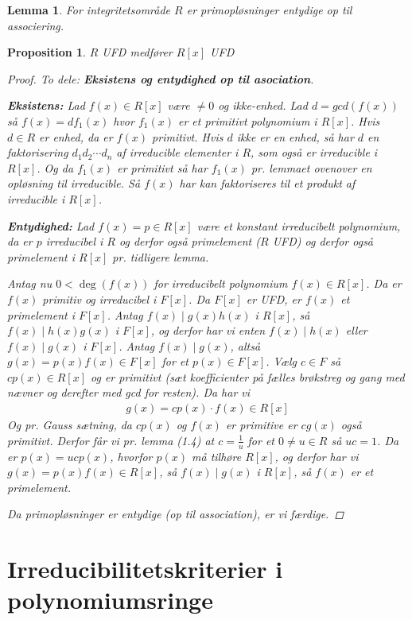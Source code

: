 \documentclass[10pt,twoside,openany,final]{memoir}
\theoremstyle{break}
\newtheorem{lemma}[section]{Lemma}
\newtheorem{proposition}[section]{Proposition}
\theoremstyle{Break}
\begin{document}
\begin{lemma}
For integritetsområde $R$ er primopløsninger entydige op til associering.
\end{lemma}
\begin{proposition}
$R$ UFD medfører $R[x]$ UFD
\begin{proof}
To dele: \textbf{Eksistens og \textbf{entydighed op til asociation}}.

\textbf{Eksistens:} Lad $f(x) \in R[x]$ være $\neq 0$ og ikke-enhed. Lad $d=gcd(f(x))$ så $f(x)=df_1(x)$ hvor $f_1(x)$ er et primitivt polynomium i $R[x]$. Hvis $d \in R$ er enhed, da er $f(x)$ primitivt. Hvis $d$ ikke er en enhed, så har $d$ en faktorisering $d_1d_2\cdots d_n$ af irreducible elementer i $R$, som også er irreducible i $R[x]$. Og da $f_1(x)$ er primitivt så har $f_1(x)$ pr. lemmaet ovenover en opløsning til irreducible. Så $f(x)$ har kan faktoriseres til et produkt af irreducible i $R[x]$.

\textbf{Entydighed:}
Lad $f(x)=p \in R[x]$ være et konstant irreducibelt polynomium, da er $p$ irreducibel i $R$ og derfor også primelement ($R$ UFD) og derfor også primelement i $R[x]$ pr. tidligere lemma.

Antag nu $0<\deg(f(x))$ for irreducibelt polynomium $f(x) \in R[x]$. Da er $f(x)$ primitiv og irreducibel i $F[x]$. Da $F[x]$ er UFD, er $f(x)$ et primelement i $F[x]$. Antag $f(x) \mid g(x) h(x)$ i $R[x]$, så $f(x) \mid h(x) g(x)$ i $F[x]$, og derfor har vi enten $f(x) \mid h(x)$ eller $f(x) \mid g(x)$ i $F[x]$. Antag $f(x) \mid g(x)$, altså $g(x)=p(x)f(x) \in F[x]$ for et $p(x) \in F[x]$. Vælg $c \in F$ så $c p(x) \in R[x]$ og er primitivt (sæt koefficienter på fælles brøkstreg og gang med nævner og derefter med gcd for resten). Da har vi 
\begin{align*}
g(x)=cp(x) \cdot f(x) \in R[x]
\end{align*}
Og pr. Gauss sætning, da $cp(x)$ og $f(x)$ er primitive er $cg(x)$ også primitivt. Derfor får vi pr. lemma (1.4) at $c=\frac1u$ for et $0 \neq u \in R$ så $uc=1$. Da er $p(x)=ucp(x)$, hvorfor $p(x)$ må tilhøre $R[x]$, og derfor har vi $g(x)=p(x)f(x) \in R[x]$, så $f(x) \mid g(x)$ i $R[x]$, så $f(x)$ er et primelement.

Da primopløsninger er entydige (op til association), er vi færdige.
\end{proof}
\end{proposition}


\chapter{Irreducibilitetskriterier i polynomiumsringe}
\end{document}
